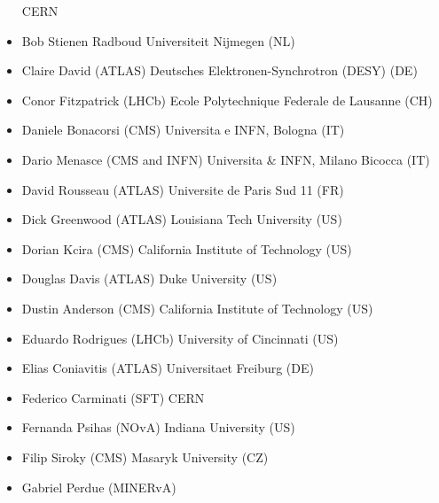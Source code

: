 \begin{itemize}
       \newline CERN
 \item Bob Stienen
       \newline Radboud Universiteit Nijmegen (NL)
 \item Claire David (ATLAS)
       \newline Deutsches Elektronen-Synchrotron (DESY) (DE)
 \item Conor Fitzpatrick (LHCb)
       \newline Ecole Polytechnique Federale de Lausanne (CH)
 \item Daniele Bonacorsi (CMS)
       \newline Universita e INFN, Bologna (IT)
 \item Dario Menasce (CMS and INFN)
       \newline Universita \& INFN, Milano Bicocca (IT)
 \item David Rousseau (ATLAS)
       \newline Universite de Paris Sud 11 (FR)
 \item Dick Greenwood (ATLAS)
       \newline Louisiana Tech University (US)
 \item Dorian Kcira (CMS)
       \newline California Institute of Technology (US)
 \item Douglas Davis (ATLAS)
       \newline Duke University (US)
 \item Dustin Anderson (CMS)
       \newline California Institute of Technology (US)
 \item Eduardo Rodrigues (LHCb)
       \newline University of Cincinnati (US)
 \item Elias Coniavitis (ATLAS)
       \newline Universitaet Freiburg (DE)
 \item Federico Carminati (SFT)
       \newline CERN
 \item Fernanda Psihas (NOvA)
       \newline Indiana University (US)
 \item Filip Siroky (CMS)
       \newline Masaryk University (CZ)
 \item Gabriel Perdue (MINERvA)

\end{itemize}
